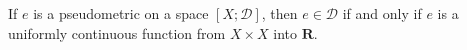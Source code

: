 If $e$ is a pseudometric on a space $[X; \mathcal{D}]$, then $e \in \mathcal{D}$ if and only if $e$ is a uniformly continuous function from $X \times X$ into $\mathbf{R}$.
